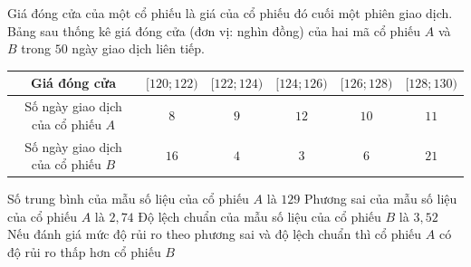 \begin{ex}%
	Giá đóng cửa của một cổ phiếu là giá của cổ phiếu đó cuối một phiên giao dịch. Bảng sau thống kê giá đóng cửa (đơn vị: nghìn đồng) của hai mã cổ phiếu $A$ và $B$ trong $50$ ngày giao dịch liên tiếp.
	\begin{center}
		\begin{tabular}{|c|c|c|c|c|c|}
			\hline
			Giá đóng cửa&$[120;122)$&$[122;124)$&$[124;126)$&$[126;128)$&$[128;130)$\\
			\hline
			Số ngày giao dịch của cổ phiếu $A$&$8$&$9$&$12$&$10$&$11$\\
			\hline
			Số ngày giao dịch của cổ phiếu $B$&$16$&$4$&$3$&$6$&$21$\\
			\hline
		\end{tabular}
	\end{center}
	\choiceTF
	{Số trung bình của mẫu số liệu của cổ phiếu $A$ là $129$}
	{Phương sai của mẫu số liệu của cổ phiếu $A$ là $2{,}74$}
	{\True Độ lệch chuẩn của mẫu số liệu của cổ phiếu $B$ là $3{,}52$}
	{\True Nếu đánh giá mức độ rủi ro theo phương sai và độ lệch chuẩn thì cổ phiếu $A$ có độ rủi ro thấp hơn cổ phiếu $B$}
\end{ex}

